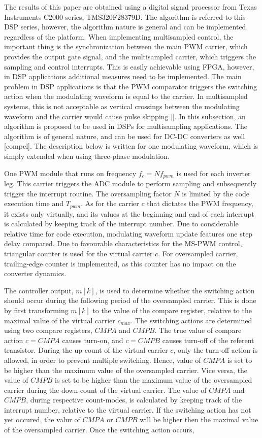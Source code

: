 \documentclass[journal]{IEEEtran}
\begin{document}
The results of this paper are obtained using a digital signal processor from Texas Instruments C2000 series, TMS320F28379D. The algorithm is referred to this DSP series, however, the algorithm nature is general and can be implemented regardless of the platform.
When implementing multisampled control, the important thing is the synchronization between the main PWM carrier, which provides the output gate signal, and the multisampled carrier, which triggers the sampling and control interrupts. This is easily achievable using FPGA, however, in DSP applications additional measures need to be implemented.
The main problem in DSP applications is that the PWM comparator triggers the switching action when the modulating waveform is equal to the carrier. In multisampled systems, this is not acceptable as vertical crossings between the modulating waveform and the carrier would cause pulse skipping []. In this subsection, an algorithm is proposed to be used in DSPs for multisampling applications. The algorithm is of general nature, and can be used for DC-DC converters as well [compel]. The description below is written for one modulating waveform, which is simply extended when using three-phase modulation.

One PWM module that runs on frequency $f_c = N f_{pwm}$ is used for each inverter leg. This carrier triggers the ADC module to perform sampling and subsequently trigger the interrupt routine. 
The oversampling factor $N$ is limited by the code execution time and $T_{pwm}$. 
As for the carrier $c$ that dictates the PWM frequency, it exists only virtually, and its values at the beginning and end of each interrupt is calculated by keeping track of the interrupt number. Due to considerable relative time for code execution, modulating waveform update features one step delay compared. 
Due to favourable characteristics for the MS-PWM control, triangular counter is used for the virtual carrier $c$. For oversampled carrier, trailing-edge counter is implemented, as this counter has no impact on the converter dynamics.

The controller output, $m[k]$, is used to determine whether the switching action should occur during the following period of the oversampled carrier. This is done by first transforming $m[k]$ to the value of the compare register, relative to the maximal value of the virtual carrier $c_{max}$. The switching actions are determined using two compare registers, $CMPA$ and $CMPB$. The true value of compare action $c = CMPA$ causes turn-on, and $c=CMPB$ causes turn-off of the referent transistor. 
During the up-count of the virtual carrier $c$, only the turn-off action is allowed, in order to prevent multiple switching. Hence, value of $CMPA$ is set to be higher than the maximum value of the oversampled carrier. Vice versa, the value of $CMPB$ is set to be higher than the maximum value of the oversampled carrier during the down-count of the virtual carrier.
The value of $CMPA$ and $CMPB$, during respective count-modes, is calculated by keeping track of the interrupt number, relative to the virtual carrier. If the switching action has not yet occured, the valur of $CMPA$ or $CMPB$ will be higher then the maximal value of the oversampled carrier. Once the switching action occurs, 
\end{document}
